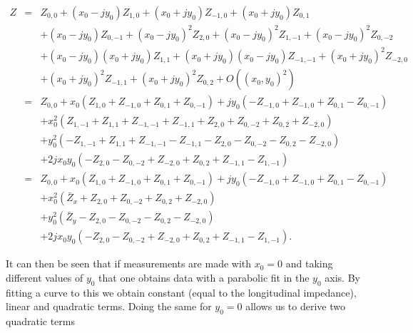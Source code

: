 \begin{align}
Z &=&Z_{0,0} +  \left( x_{0} - jy_{0} \right) Z_{1,0} + \left( x_{0} + jy_{0} \right)  Z_{-1,0} + \left( x_{0} + jy_{0} \right) Z_{0,1} \nonumber \\
   &   &+ \left( x_{0} - jy_{0} \right) Z_{0,-1} + \left( x_{0} - jy_{0} \right)^{2} Z_{2,0} + \left( x_{0} - jy_{0} \right)^{2} Z_{1,-1} + \left( x_{0} - jy_{0} \right) ^{2}Z_{0,-2} \nonumber \\
   &   &+\left( x_{0} - jy_{0} \right) \left( x_{0} + jy_{0} \right) Z_{1,1} + \left( x_{0} + jy_{0} \right)\left( x_{0} - jy_{0} \right) Z_{-1,-1} + \left( x_{0} + jy_{0} \right)^{2}Z_{-2,0} \nonumber \\
   &   &+\left( x_{0} + jy_{0} \right)^{2} Z_{-1,1} + \left( x_{0} + jy_{0} \right)^{2}Z_{0,2} + O\left( \left(x_{0},y_{0} \right)^{2} \right) \nonumber \\
   &=&Z_{0,0} + x_{0}\left( Z_{1,0}+Z_{-1,0}+Z_{0,1}+Z_{0,-1} \right) +jy_{0} \left( -Z_{-1,0} + Z_{-1,0} + Z_{0,1} - Z_{0,-1} \right) \nonumber \\
   &   &+x_{0}^{2} \left(  Z_{1,-1}+Z_{1,1}+Z_{-1,-1}+Z_{-1,1} + Z_{2,0} + Z_{0,-2} + Z_{0,2} + Z_{-2,0} \right) \nonumber \\
   &   &+y_{0}^{2} \left(  -Z_{1,-1}+Z_{1,1}+Z_{-1,-1}-Z_{-1,1} - Z_{2,0} - Z_{0,-2} - Z_{0,2} - Z_{-2,0} \right) \nonumber \\
   &   &+2jx_{0}y_{0}\left( -Z_{2,0} - Z_{0,-2} + Z_{-2,0} + Z_{0,2} + Z_{-1,1} - Z_{1,-1} \right) \nonumber \\
   &=&Z_{0,0} + x_{0}\left( Z_{1,0}+Z_{-1,0}+Z_{0,1}+Z_{0,-1} \right) +jy_{0} \left( -Z_{-1,0} + Z_{-1,0} + Z_{0,1} - Z_{0,-1} \right) \nonumber \\
   &   &+x_{0}^{2} \left( \bar{Z}_{x} + Z_{2,0} + Z_{0,-2} + Z_{0,2} + Z_{-2,0} \right) \nonumber \\
   &   &+y_{0}^{2} \left( \bar{Z}_{y} - Z_{2,0} - Z_{0,-2} - Z_{0,2} - Z_{-2,0} \right) \nonumber \\
   &   &+2jx_{0}y_{0}\left( -Z_{2,0} - Z_{0,-2} + Z_{-2,0} + Z_{0,2} + Z_{-1,1} - Z_{1,-1} \right).
\label{eqn:gen_single_wire}
\end{align}

It can then be seen that if measurements are made with $x_{0} = 0$ and taking different values of $y_{0}$ that one obtains data with a parabolic fit in the $y_{0}$ axis. By fitting a curve to this we obtain constant (equal to the longitudinal impedance), linear and quadratic terms. Doing the same for $y_{0}=0$ allows us to derive two quadratic terms

